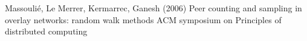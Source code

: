 	\begin{footnotesize}
	\begin{thebibliography}{}
		Massoulié, Le Merrer, Kermarrec, Ganesh (2006)
		\newblock Peer counting and sampling in overlay networks: random walk methods
		\newblock ACM symposium on Principles of distributed computing
	\end{thebibliography}
	\end{footnotesize}
